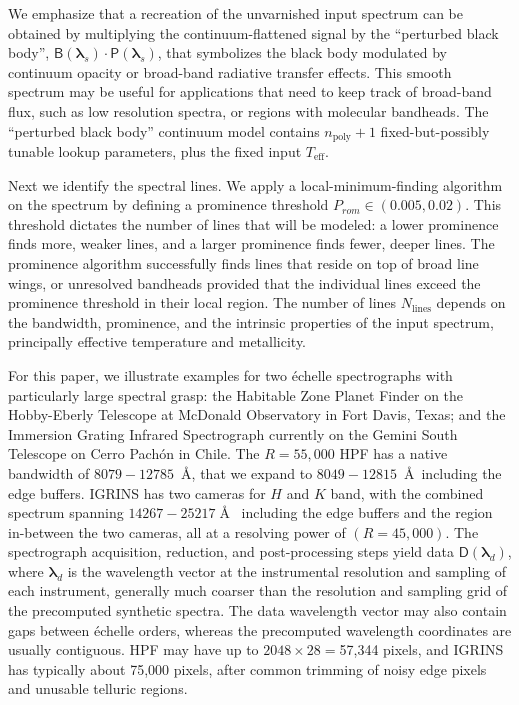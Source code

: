 \documentclass[modern]{aastex631}
\begin{document}
We emphasize that a recreation of the unvarnished input spectrum can be obtained by multiplying the continuum-flattened signal by the ``perturbed black body'', $\mathsf{B}(\bm{\lambda}_s)\cdot \mathsf{P}(\bm{\lambda}_s)$, that symbolizes the black body modulated by continuum opacity or broad-band radiative transfer effects.  This smooth spectrum may be useful for applications that need to keep track of broad-band flux, such as low resolution spectra, or regions with molecular bandheads.  The ``perturbed black body'' continuum model contains $n_{\mathrm{poly}}+1$ fixed-but-possibly tunable lookup parameters, plus the fixed input $T_{\mathrm{eff}}$.


Next we identify the spectral lines.  We apply a local-minimum-finding algorithm on the spectrum by defining a prominence threshold $P_{rom} \in (0.005, 0.02)$.  This threshold dictates the number of lines that will be modeled: a lower prominence finds more, weaker lines, and a larger prominence finds fewer, deeper lines.  The prominence algorithm successfully finds lines that reside on top of broad line wings, or unresolved bandheads provided that the individual lines exceed the prominence threshold in their local region.  The number of lines $N_{\mathrm{lines}}$ depends on the bandwidth, prominence, and the intrinsic properties of the input spectrum, principally effective temperature and metallicity.

For this paper, we illustrate examples for two \'echelle spectrographs with particularly large spectral grasp: the Habitable Zone Planet Finder \citep[HPF,][]{2014SPIE.9147E..1GM} on the Hobby-Eberly Telescope at McDonald Observatory in Fort Davis, Texas; and the Immersion Grating Infrared Spectrograph \citep[IGRINS,][]{park14}
currently on the Gemini South Telescope on Cerro Pach\'on in Chile.  The $R=55,000$ HPF has a native bandwidth of $8079-12785$~\AA, that we expand to $8049-12815$~\AA~including the edge buffers.  IGRINS has two cameras for $H$ and $K$ band, with the combined spectrum spanning $14267-25217\;$\AA~ including the edge buffers and the region in-between the two cameras, all at a resolving power of $(R=45,000)$.  The spectrograph acquisition, reduction, and post-processing steps yield data $\mathsf{D}(\bm{\lambda}_{d})$, where $\bm{\lambda}_{d}$ is the wavelength vector at the instrumental resolution and sampling of each instrument, generally much coarser than the resolution and sampling grid of the precomputed synthetic spectra.  The data wavelength vector may also contain gaps between \'echelle orders, whereas the precomputed wavelength coordinates are usually contiguous.  HPF may have up to $2048\times28=$57,344 pixels, and IGRINS has typically about 75,000 pixels, after common trimming of noisy edge pixels and unusable telluric regions.
\end{document}
